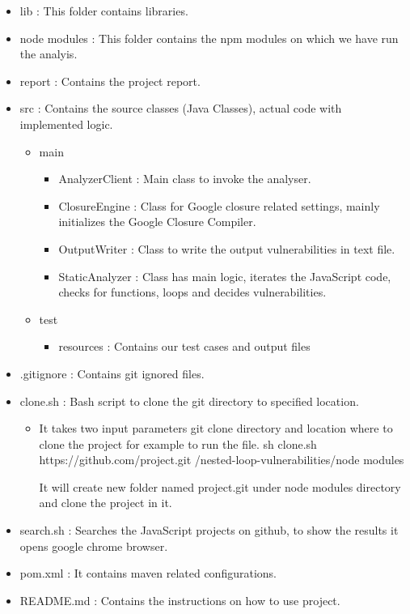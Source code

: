 \documentclass[authoryear,preprint]{sigplanconf}
\begin{document}
\begin{itemize}
\item lib : This folder contains libraries.
\item node modules : This folder contains the npm modules on which we have run the analyis.
\item report : Contains the project report.
\item src : Contains the source classes (Java Classes), actual code with implemented logic.
	\begin{itemize}
		\item main
			\begin{itemize}
		\item AnalyzerClient : Main class to invoke the analyser.
		\item ClosureEngine : Class for Google closure related settings, mainly initializes the Google Closure Compiler.
		\item OutputWriter : Class to write the output vulnerabilities in text file.
		\item StaticAnalyzer : Class has main logic, iterates the JavaScript code, checks for functions, loops and decides vulnerabilities.\end{itemize}
		
		\item test
			\begin{itemize}
				\item resources : Contains our test cases and output files
			\end{itemize}
		
	\end{itemize}

\item .gitignore : Contains git ignored files.
\item clone.sh : Bash script to clone the git directory to specified location.
	\begin{itemize}
		\item It takes two input parameters git clone directory and location where to clone the project for example to run the file.
		sh clone.sh https://github.com/project.git /nested-loop-vulnerabilities/node modules
		
		It will create new folder named project.git under node modules directory and clone the project in it.
		
	\end{itemize}

\item search.sh : Searches the JavaScript projects on github, to show the results it opens google chrome browser.

\item pom.xml : It contains maven related configurations.
\item README.md : Contains the instructions on how to use project.
		
\end{itemize}
\end{document}
